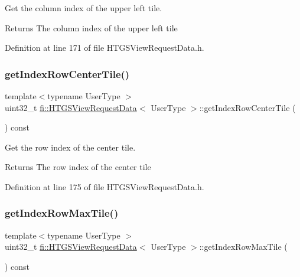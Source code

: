 Get the column index of the upper left tile. 

\begin{DoxyReturn}{Returns}
The column index of the upper left tile 
\end{DoxyReturn}


Definition at line 171 of file H\+T\+G\+S\+View\+Request\+Data.\+h.

\mbox{\label{classfi_1_1HTGSViewRequestData_a75cb6c1101620ad695592d3ac872ab51}} 
\subsubsection{\texorpdfstring{get\+Index\+Row\+Center\+Tile()}{getIndexRowCenterTile()}}
{\footnotesize\ttfamily template$<$typename User\+Type $>$ \\
uint32\+\_\+t \hyperlink{classfi_1_1HTGSViewRequestData}{fi\+::\+H\+T\+G\+S\+View\+Request\+Data}$<$ User\+Type $>$\+::get\+Index\+Row\+Center\+Tile (\begin{DoxyParamCaption}{ }\end{DoxyParamCaption}) const\hspace{0.3cm}{\ttfamily [inline]}}



Get the row index of the center tile. 

\begin{DoxyReturn}{Returns}
The row index of the center tile 
\end{DoxyReturn}


Definition at line 175 of file H\+T\+G\+S\+View\+Request\+Data.\+h.

\mbox{\label{classfi_1_1HTGSViewRequestData_ad852d2cc5fdc92b39474277efd8d601e}} 
\subsubsection{\texorpdfstring{get\+Index\+Row\+Max\+Tile()}{getIndexRowMaxTile()}}
{\footnotesize\ttfamily template$<$typename User\+Type $>$ \\
uint32\+\_\+t \hyperlink{classfi_1_1HTGSViewRequestData}{fi\+::\+H\+T\+G\+S\+View\+Request\+Data}$<$ User\+Type $>$\+::get\+Index\+Row\+Max\+Tile (\begin{DoxyParamCaption}{ }\end{DoxyParamCaption}) const\hspace{0.3cm}{\ttfamily [inline]}}



